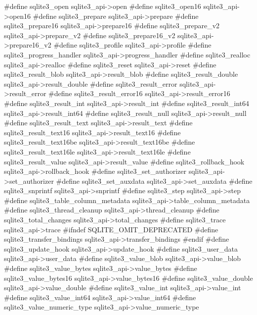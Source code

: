 \begin{Codex}[label=sqlite3ext.h,numbers=left]
#define sqlite3_open                   sqlite3_api->open
#define sqlite3_open16                 sqlite3_api->open16
#define sqlite3_prepare                sqlite3_api->prepare
#define sqlite3_prepare16              sqlite3_api->prepare16
#define sqlite3_prepare_v2             sqlite3_api->prepare_v2
#define sqlite3_prepare16_v2           sqlite3_api->prepare16_v2
#define sqlite3_profile                sqlite3_api->profile
#define sqlite3_progress_handler       sqlite3_api->progress_handler
#define sqlite3_realloc                sqlite3_api->realloc
#define sqlite3_reset                  sqlite3_api->reset
#define sqlite3_result_blob            sqlite3_api->result_blob
#define sqlite3_result_double          sqlite3_api->result_double
#define sqlite3_result_error           sqlite3_api->result_error
#define sqlite3_result_error16         sqlite3_api->result_error16
#define sqlite3_result_int             sqlite3_api->result_int
#define sqlite3_result_int64           sqlite3_api->result_int64
#define sqlite3_result_null            sqlite3_api->result_null
#define sqlite3_result_text            sqlite3_api->result_text
#define sqlite3_result_text16          sqlite3_api->result_text16
#define sqlite3_result_text16be        sqlite3_api->result_text16be
#define sqlite3_result_text16le        sqlite3_api->result_text16le
#define sqlite3_result_value           sqlite3_api->result_value
#define sqlite3_rollback_hook          sqlite3_api->rollback_hook
#define sqlite3_set_authorizer         sqlite3_api->set_authorizer
#define sqlite3_set_auxdata            sqlite3_api->set_auxdata
#define sqlite3_snprintf               sqlite3_api->snprintf
#define sqlite3_step                   sqlite3_api->step
#define sqlite3_table_column_metadata  sqlite3_api->table_column_metadata
#define sqlite3_thread_cleanup         sqlite3_api->thread_cleanup
#define sqlite3_total_changes          sqlite3_api->total_changes
#define sqlite3_trace                  sqlite3_api->trace
#ifndef SQLITE_OMIT_DEPRECATED
#define sqlite3_transfer_bindings      sqlite3_api->transfer_bindings
#endif
#define sqlite3_update_hook            sqlite3_api->update_hook
#define sqlite3_user_data              sqlite3_api->user_data
#define sqlite3_value_blob             sqlite3_api->value_blob
#define sqlite3_value_bytes            sqlite3_api->value_bytes
#define sqlite3_value_bytes16          sqlite3_api->value_bytes16
#define sqlite3_value_double           sqlite3_api->value_double
#define sqlite3_value_int              sqlite3_api->value_int
#define sqlite3_value_int64            sqlite3_api->value_int64
#define sqlite3_value_numeric_type     sqlite3_api->value_numeric_type

\end{Codex}
